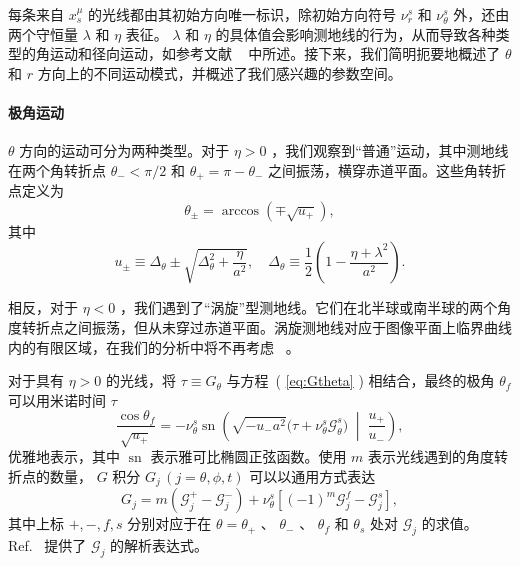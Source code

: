 \documentclass[aps,reprint,superscriptaddress,nofootinbib,floatfix,longbibliography,preprintnumbers]{revtex4-1}
\newcommand{\G}{\mathcal{G}}
\begin{document}
每条来自    $x_s^{\mu}$    的光线都由其初始方向唯一标识，除初始方向符号    $\nu_r^s$    和    $\nu_{\theta}^s$    外，还由两个守恒量    $\lambda$    和    $\eta$    表征。   $\lambda$    和    $\eta$    的具体值会影响测地线的行为，从而导致各种类型的角运动和径向运动，如参考文献 ~    \cite{Gralla:2019ceu,Gralla:2019drh}    中所述。接下来，我们简明扼要地概述了    $\theta$    和    $r$    方向上的不同运动模式，并概述了我们感兴趣的参数空间。  

   \paragraph{极角运动  }       $\theta$    方向的运动可分为两种类型。对于    $\eta>0$    ，我们观察到“普通”运动，其中测地线在两个角转折点    $\theta_-<\pi/2$    和    $\theta_+=\pi-\theta_-$    之间振荡，横穿赤道平面。这些角转折点定义为~    \cite{Gralla:2019ceu,Gralla:2019drh}    
   \begin{equation}
     \theta_{\pm}=\arccos(\mp\sqrt{u_+}),
 \end{equation}    其中
   \begin{equation}
    u_{\pm} \equiv \Delta_{\theta}\pm\sqrt{\Delta_{\theta}^2+\frac{\eta}{a^2}},\quad\Delta_{\theta} \equiv \frac{1}{2}\left(1-\frac{\eta+\lambda^2}{a^2}\right).
 \end{equation}     

相反，对于    $\eta<0$    ，我们遇到了“涡旋”型测地线。它们在北半球或南半球的两个角度转折点之间振荡，但从未穿过赤道平面。涡旋测地线对应于图像平面上临界曲线内的有限区域，在我们的分析中将不再考虑~    \cite{Gralla:2019drh}    。  

对于具有    $\eta>0$    的光线，将    $\tau \equiv G_\theta$    与方程~(    \ref{eq:Gtheta}    ) 相结合，最终的极角    $\theta_f$    可以用米诺时间    $\tau$    ~    \cite{Gralla:2019ceu}    
   \begin{equation}
    \frac{\cos\theta_f}{\sqrt{u_+}}=-\nu_{\theta}^s\operatorname{sn}\left(\sqrt{-u_-a^2}\big(\tau+\nu_{\theta}^s\G_{\theta}^s\big)\;\middle|\;\frac{u_+}{u_-}\right),
    \label{eq:theta_f}
\end{equation}    优雅地表示，其中    $\operatorname{sn}$    表示雅可比椭圆正弦函数。使用    $m$    表示光线遇到的角度转折点的数量，    $G$    积分    $G_j\, (j=\theta,\phi,t)$    可以以通用方式表达~    \cite{Gralla:2019ceu}    
   \begin{equation}
 G_j=m\left(\G_j^+-\G_j^-\right)+\nu_{\theta}^s\left[(-1)^m\G_j^f-\G_j^s\right],
 \label{eq:angular int}
 \end{equation}    其中上标    ${+,-,f,s}$    分别对应于在    $\theta=\theta_+$    、    $\theta_-$    、    $\theta_f$    和    $\theta_s$    处对    $\G_j$    的求值。 Ref.~    \cite{Gralla:2019ceu}    提供了    $\G_j$    的解析表达式。  
\end{document}
